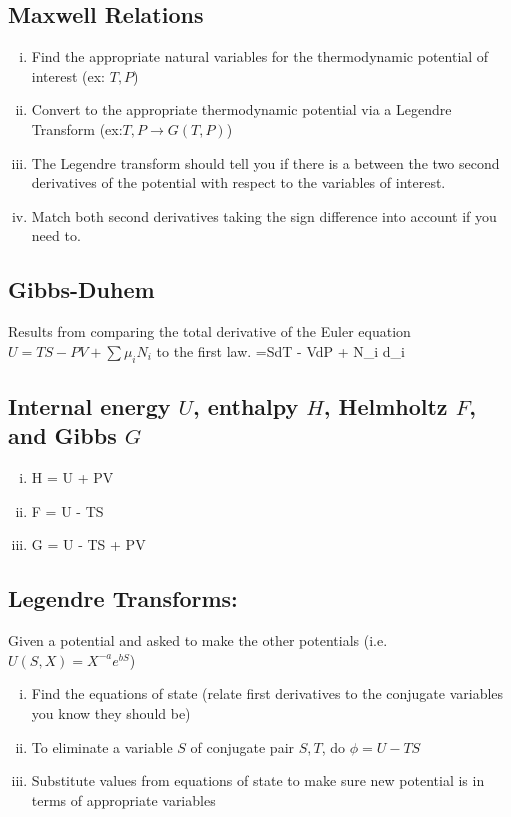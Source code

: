 \documentclass[12pt]{article}
\begin{document}
\subsection{Maxwell Relations}
\begin{enumerate}[(i)]
\item Find the appropriate natural variables for the thermodynamic potential of interest (ex: $T,P$)
\item Convert to the appropriate thermodynamic potential via a Legendre Transform (ex:$T,P \rightarrow G(T,P)$)
\item The Legendre transform should tell you if there is a  between the two second derivatives of the potential with respect to the variables of interest.
\item Match both second derivatives taking the sign difference into account if you need to.
\end{enumerate}
\subsection{Gibbs-Duhem}
Results from comparing the total derivative of the Euler equation $U = TS - PV + \sum\mu_i N_i$ to the first law.
=SdT - VdP + \sum N_i d\mu_i
\eqe
\subsection{Internal energy $U$, enthalpy $H$, Helmholtz $F$, and Gibbs $G$}
\begin{enumerate}[(i)]
\item H = U + PV
\item F = U - TS
\item G = U - TS + PV
\end{enumerate}
\subsection{Legendre Transforms:}
Given a potential and asked to make the other potentials (i.e. $U(S,X) = X^{-a}e^{bS}$)
\begin{enumerate}[(i)]
\item Find the equations of state (relate first derivatives to the conjugate variables you know they should be)
\item To eliminate a variable $S$ of conjugate pair $S,T$, do $\phi= U-TS$
\item Substitute values from equations of state to make sure new potential is in terms of appropriate variables
\end{enumerate}
%
\end{document}
